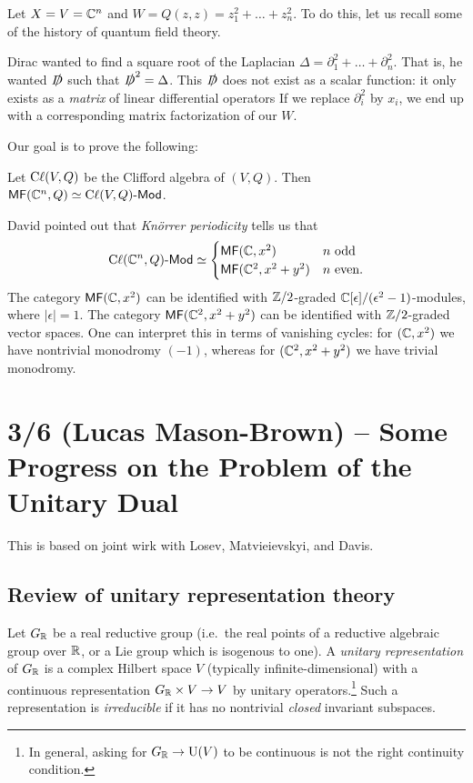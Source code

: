 \documentclass{article}
\begin{document}
Let $X = V = \mathbb{C}^n$ and $W = Q(z, z) = z_1^2 + \dots + z_n^2$.
To do this, let us recall some of the history of quantum field theory.

Dirac wanted to find a square root of the Laplacian $\Delta = \partial_1^2 + \dots + \partial_n^2$.
That is, he wanted $\slashed{D}$ such that $\slashed{D}^2 = \Delta$.
This $\slashed{D}$ does not exist as a scalar function: it only exists as a \emph{matrix} of linear differential operators
If we replace $\partial_i^2$ by $x_i$, we end up with a corresponding matrix factorization of our $W$.

Our goal is to prove the following:

\begin{thm}
	Let $\operatorname{C\ell}(V, Q)$ be the Clifford algebra of $(V, Q)$.
	Then $\mathsf{MF}(\mathbb{C}^n, Q) \simeq \operatorname{C\ell}(V, Q)\text{-}\mathsf{Mod}$.
\end{thm}

David pointed out that \emph{Kn\"orrer periodicity} tells us that
\[
	\operatorname{C\ell}(\mathbb{C}^n, Q)\text{-}\mathsf{Mod} \simeq \begin{cases}
		\mathsf{MF}(\mathbb{C}, x^2) & n \textrm{ odd} \\
		\mathsf{MF}(\mathbb{C}^2, x^2 + y^2) & n \textrm{ even}.
	\end{cases}
\]
The category $\mathsf{MF}(\mathbb{C}, x^2)$ can be identified with $\mathbb{Z}/2$-graded $\mathbb{C}[\epsilon] / (\epsilon^2 - 1)$-modules, where $|\epsilon| = 1$.
The category $\mathsf{MF}(\mathbb{C}^2, x^2 + y^2)$ can be identified with $\mathbb{Z}/2$-graded vector spaces.
One can interpret this in terms of vanishing cycles: for $(\mathbb{C}, x^2)$ we have nontrivial monodromy $(-1)$, whereas for $(\mathbb{C}^2, x^2 + y^2)$ we have trivial monodromy.

\section{3/6 (Lucas Mason-Brown) -- Some Progress on the Problem of the Unitary Dual}

This is based on joint wirk with Losev, Matvieievskyi, and Davis.

\subsection{Review of unitary representation theory}

Let $G_{\mathbb{R}}$ be a real reductive group (i.e.\ the real points of a reductive algebraic group over $\mathbb{R}$, or a Lie group which is isogenous to one).
A \emph{unitary representation} of $G_{\mathbb{R}}$ is a complex Hilbert space $V$ (typically infinite-dimensional) with a continuous representation $G_{\mathbb{R}} \times V \to V$ by unitary operators.\footnote{In general, asking for $G_{\mathbb{R}} \to \operatorname{U}(V)$ to be continuous is not the right continuity condition.}
Such a representation is \emph{irreducible} if it has no nontrivial \emph{closed} invariant subspaces.
\end{document}
